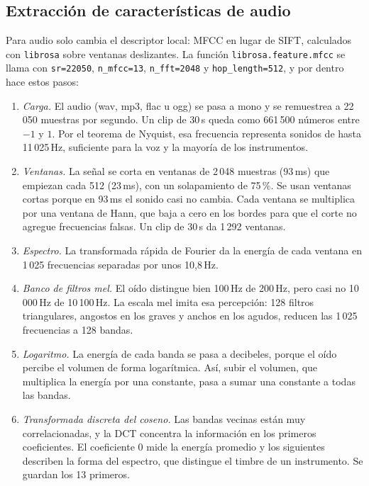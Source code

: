 \documentclass[11pt,a4paper]{article}
\begin{document}
\subsection{Extracción de características de audio}

Para audio solo cambia el descriptor local: MFCC en lugar de SIFT, calculados con \texttt{librosa} sobre ventanas deslizantes. La función \texttt{librosa.feature.mfcc} se llama con \texttt{sr=22050}, \texttt{n\_mfcc=13}, \texttt{n\_fft=2048} y \texttt{hop\_length=512}, y por dentro hace estos pasos:

\begin{enumerate}
  \item \emph{Carga.} El audio (wav, mp3, flac u ogg) se pasa a mono y se remuestrea a 22\,050 muestras por segundo. Un clip de 30\,s queda como 661\,500 números entre $-1$ y $1$. Por el teorema de Nyquist, esa frecuencia representa sonidos de hasta 11\,025\,Hz, suficiente para la voz y la mayoría de los instrumentos.
  \item \emph{Ventanas.} La señal se corta en ventanas de 2\,048 muestras (93\,ms) que empiezan cada 512 (23\,ms), con un solapamiento de 75\,\%. Se usan ventanas cortas porque en 93\,ms el sonido casi no cambia. Cada ventana se multiplica por una ventana de Hann, que baja a cero en los bordes para que el corte no agregue frecuencias falsas. Un clip de 30\,s da 1\,292 ventanas.
  \item \emph{Espectro.} La transformada rápida de Fourier da la energía de cada ventana en 1\,025 frecuencias separadas por unos 10,8\,Hz.
  \item \emph{Banco de filtros mel.} El oído distingue bien 100\,Hz de 200\,Hz, pero casi no 10\,000\,Hz de 10\,100\,Hz. La escala mel imita esa percepción: 128 filtros triangulares, angostos en los graves y anchos en los agudos, reducen las 1\,025 frecuencias a 128 bandas.
  \item \emph{Logaritmo.} La energía de cada banda se pasa a decibeles, porque el oído percibe el volumen de forma logarítmica. Así, subir el volumen, que multiplica la energía por una constante, pasa a sumar una constante a todas las bandas.
  \item \emph{Transformada discreta del coseno.} Las bandas vecinas están muy correlacionadas, y la DCT concentra la información en los primeros coeficientes. El coeficiente 0 mide la energía promedio y los siguientes describen la forma del espectro, que distingue el timbre de un instrumento. Se guardan los 13 primeros.
\end{enumerate}
\end{document}
